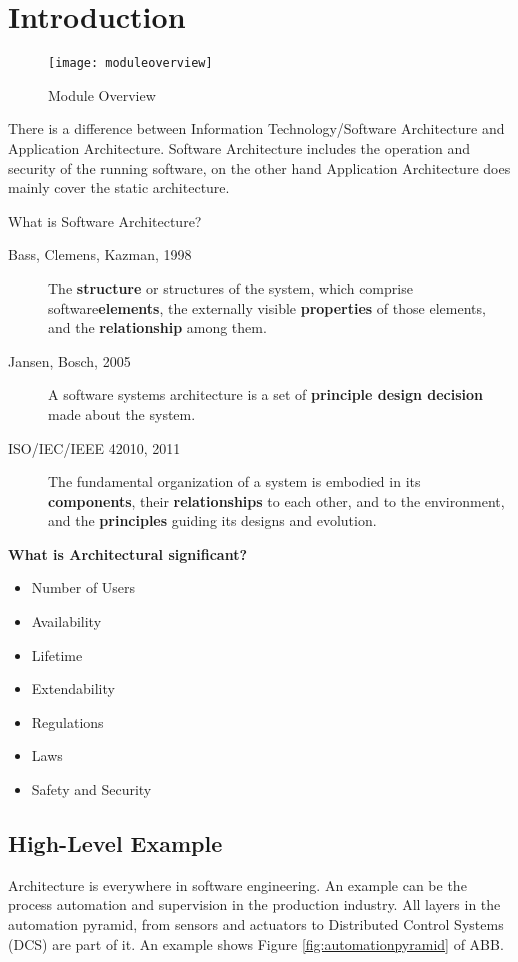 \section{Introduction}
\begin{figure}[H]
	\center
	\texttt{[image: moduleoverview]}
	\caption{Module Overview}
	\label{fig:moduleoverview}
\end{figure}
There is a difference between Information Technology/Software Architecture and Application Architecture. Software Architecture includes the operation and security of the running software, on the other hand Application Architecture does mainly cover the static architecture.

What is Software Architecture?
\begin{description}
	\item [Bass, Clemens, Kazman, 1998] The \textbf{structure} or structures of the system, which comprise software\textbf{elements}, the externally visible \textbf{properties} of those elements, and the \textbf{relationship} among them.
	\item [Jansen, Bosch, 2005] A software systems architecture is a set of \textbf{principle design decision} made about the system.
	\item [ISO/IEC/IEEE 42010, 2011] The fundamental organization of a system is embodied in its \textbf{components}, their \textbf{relationships} to each other, and to the environment, and the \textbf{principles} guiding its designs and evolution.
\end{description}

\textbf{What is Architectural significant?}
\begin{itemize}
	\item Number of Users
	\item Availability
	\item Lifetime
	\item Extendability
	\item Regulations
	\item Laws
	\item Safety and Security
\end{itemize}

\subsection{High-Level Example}
Architecture is everywhere in software engineering. An example can be the process automation and supervision in  the production industry. All layers in the automation pyramid, from sensors and actuators to Distributed Control Systems (DCS) are part of it. An example shows Figure \ref{fig:automationpyramid} of ABB.

